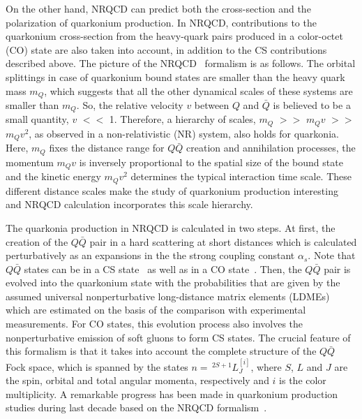 \documentclass{iopart}
\begin{document}
On the other hand, NRQCD can predict both the cross-section and the polarization of quarkonium production. In NRQCD, contributions to the quarkonium cross-section from the heavy-quark pairs produced in a color-octet (CO) state are also taken into account, in addition to the CS contributions described above.     
The picture of the NRQCD~\cite{prd51} formalism is as follows. The orbital splittings in case of quarkonium bound states are smaller than the heavy quark mass $m_{Q}$, which suggests that all the other dynamical scales of these systems are smaller than $m_{Q}$. So, the relative velocity $v$ between $Q$ and $\bar Q$ is believed to be a small quantity, $v$ $<<$ 1. Therefore, a hierarchy of scales, $m_{Q}$ $>>$ $m_{Q}v$ $>>$ $m_{Q}v^{2}$, as observed in a non-relativistic (NR) system, also holds for quarkonia. Here, $m_{Q}$ fixes the distance range for $Q\bar Q$ creation and 
annihilation processes, the momentum $m_{Q}v$ is inversely proportional to the spatial size of the bound state and the kinetic energy $m_{Q}v^{2}$ determines the typical interaction time scale. These different distance scales make the study of quarkonium production interesting and NRQCD calculation incorporates this scale hierarchy. 

The quarkonia production in NRQCD is calculated in two steps. At first, the creation of the $Q\bar Q$ pair in a hard scattering at short distances which is calculated perturbatively as an expansions in the the strong coupling constant $\alpha_{s}$. Note that $Q\bar Q$ states can be in a CS state~\cite{zpc19,npb291,plb184} as well as in a CO state~\cite{prl74,prd53,prd53a}. Then, the $Q\bar Q$ pair is evolved into the quarkonium state with the probabilities that are given by the assumed universal nonperturbative long-distance matrix elements (LDMEs) which are estimated on the basis of the comparison with experimental measurements. For CO states, this evolution process also involves the nonperturbative emission of soft gluons to form CS states. The crucial feature of this formalism is that it takes into account the complete structure of the $Q\bar Q$ Fock space, which is spanned by the states $n=\,^{2S+1}L^{[i]}_J$, where $S$, $L$ and $J$ are the spin, orbital and total angular momenta, respectively and $i$ is the color multiplicity. A remarkable progress has been made in quarkonium production studies during last decade based on the NRQCD formalism~\cite{prd78,prl100,plb673,prd84,prl106,prl106a,prl110,prl113}.
\end{document}
